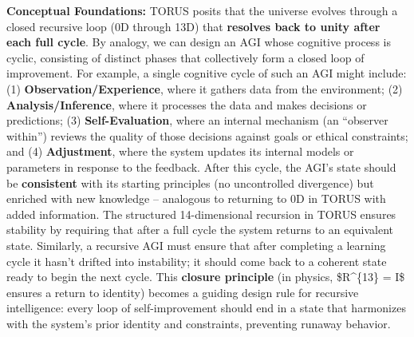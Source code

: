 \documentclass[
]{article}
\begin{document}
\textbf{Conceptual Foundations:} TORUS posits that the universe evolves
through a closed recursive loop (0D through 13D) that \textbf{resolves
back to unity after each full cycle}. By analogy, we can design an AGI
whose cognitive process is cyclic, consisting of distinct phases that
collectively form a closed loop of improvement. For example, a single
cognitive cycle of such an AGI might include: (1)
\textbf{Observation/Experience}, where it gathers data from the
environment; (2) \textbf{Analysis/Inference}, where it processes the
data and makes decisions or predictions; (3) \textbf{Self-Evaluation},
where an internal mechanism (an ``observer within'') reviews the quality
of those decisions against goals or ethical constraints; and (4)
\textbf{Adjustment}, where the system updates its internal models or
parameters in response to the feedback. After this cycle, the AGI's
state should be \textbf{consistent} with its starting principles (no
uncontrolled divergence) but enriched with new knowledge -- analogous to
returning to 0D in TORUS with added information. The structured
14-dimensional recursion in TORUS ensures stability by requiring that
after a full cycle the system returns to an equivalent state. Similarly,
a recursive AGI must ensure that after completing a learning cycle it
hasn't drifted into instability; it should come back to a coherent state
ready to begin the next cycle. This \textbf{closure principle} (in
physics, \$R\^{}\{13\} = I\$ ensures a return to identity) becomes a
guiding design rule for recursive intelligence: every loop of
self-improvement should end in a state that harmonizes with the system's
prior identity and constraints, preventing runaway behavior.
\end{document}
